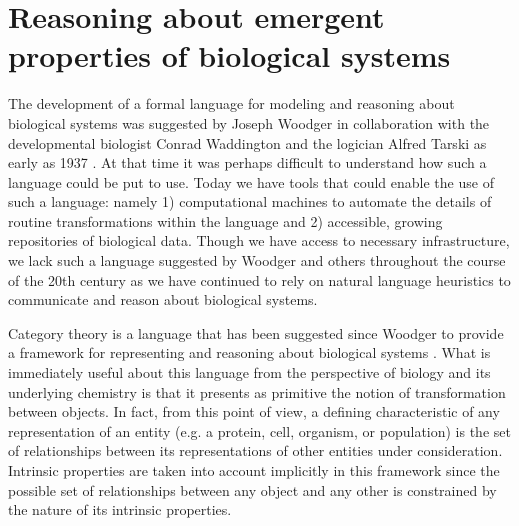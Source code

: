 \documentclass[aps,twocolumn]{revtex4-1}
\begin{document}
\tableofcontents

\section{Reasoning about emergent properties of biological systems}

The development of a formal language for modeling and reasoning about biological systems was suggested by Joseph Woodger in collaboration with the developmental biologist Conrad Waddington and the logician Alfred Tarski as early as 1937 \cite{Woodger1937,Woodger1951,Woodger1952,Woodger1952a}. At that time it was perhaps difficult to understand how such a language could be put to use. Today we have tools that could enable the use of such a language: namely 1) computational machines to automate the details of routine transformations within the language and 2) accessible, growing repositories of biological data. Though we have access to necessary infrastructure, we lack such a language suggested by Woodger and others throughout the course of the 20th century as we have continued to rely on natural language heuristics to communicate and reason about biological systems.

Category theory \cite{Lane1985,Lane1998,MacLane1992,Lawvere1997,Lawvere2003,Awodey2006} is a language that has been suggested since Woodger to provide a framework for representing and reasoning about biological systems \cite{Rashevsky1954,Rosen1958,Rosen1958a,Rosen1978,GOGUEN1979,Rosen1985,Rosen1991,Ehresmann2007,Louie2009}. What is immediately useful about this language from the perspective of biology and its underlying chemistry is that it presents as primitive the notion of transformation between objects. In fact, from this point of view, a defining characteristic of any representation of an entity (e.g. a protein, cell, organism, or population) is the set of relationships between its representations of other entities under consideration. Intrinsic properties are taken into account implicitly in this framework since the possible set of relationships between any object and any other is constrained by the nature of its intrinsic properties. 
\end{document}
